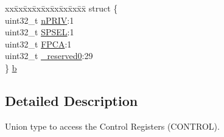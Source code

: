 \begin{DoxyCompactItemize}
\begin{tabbing}
\end{tabbing}\item 
\begin{tabbing}
xx\=xx\=xx\=xx\=xx\=xx\=xx\=xx\=xx\=\kill
struct \{\\
\>uint32\_t \hyperlink{union_c_o_n_t_r_o_l___type_a2a6e513e8a6bf4e58db169e312172332}{nPRIV}:1\\
\>uint32\_t \hyperlink{union_c_o_n_t_r_o_l___type_ae185aac93686ffc78e998a9daf41415b}{SPSEL}:1\\
\>uint32\_t \hyperlink{union_c_o_n_t_r_o_l___type_a2518558c090f60161ba4e718a54ee468}{FPCA}:1\\
\>uint32\_t \hyperlink{union_c_o_n_t_r_o_l___type_ac8a6a13838a897c8d0b8bc991bbaf7c1}{\_reserved0}:29\\
\} \hyperlink{union_c_o_n_t_r_o_l___type_ae03cf62a84c9224544bebc7eed2d730d}{b}\\

\end{tabbing}\end{DoxyCompactItemize}


\subsection{Detailed Description}
Union type to access the Control Registers (C\-O\-N\-T\-R\-O\-L). 

